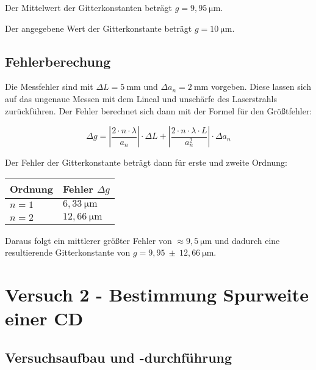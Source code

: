         Der Mittelwert der Gitterkonstanten beträgt $g = 9,95\ \mathrm{\mu m}$.

        Der angegebene Wert der Gitterkonstante beträgt $g = 10\ \mathrm{\mu m}$.
    
    \subsection{Fehlerberechung}
        
        Die Messfehler sind mit $\Delta L = 5\ \mathrm{mm}$ und $\Delta a_{n} = 2\ \mathrm{mm}$ vorgeben. Diese lassen sich auf das ungenaue Messen mit dem Lineal und unschärfe des Laserstrahls zurückführen. Der Fehler berechnet sich dann mit der Formel für den Größtfehler:

        $$\Delta g = \left|\frac{2 \cdot n \cdot \lambda}{a_{n}}\right| \cdot \Delta L + \left|\frac{2 \cdot n \cdot \lambda \cdot L}{a_{n}^{2}}\right| \cdot \Delta a_{n}$$

        Der Fehler der Gitterkonstante beträgt dann für erste und zweite Ordnung:

        \begin{table}[H]
            \centering
            \begin{tabular}{|l|l|}
                \hline
                Ordnung & Fehler $\Delta g$\\
                \hline
                $n = 1$ & $6,33\ \mathrm{\mu m}$\\
                \hline
                $n = 2$ & $12,66\ \mathrm{\mu m}$\\
                \hline
            \end{tabular}
        \end{table}
        
        Daraus folgt ein mittlerer größter Fehler von $\approx 9,5\ \mathrm{\mu m}$ und dadurch eine resultierende Gitterkonstante von $g = 9,95\ \pm\ 12,66 \ \mathrm{\mu m}$.

      

\section{Versuch 2 - Bestimmung Spurweite einer CD}
    
    \subsection{Versuchsaufbau und -durchführung}
        
